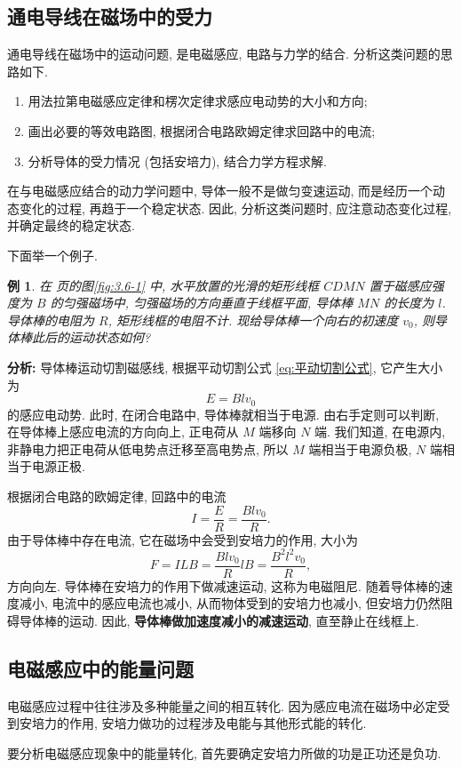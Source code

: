 \documentclass[UTF8,openany,fontset=fandol]{ctexbook}
\theoremstyle{chinesetextbook}
\newtheorem{example}{例}[chapter]
\begin{document}
\subsection{通电导线在磁场中的受力}
通电导线在磁场中的运动问题, 是电磁感应, 电路与力学的结合. 分析这类问题的思路如下.
\begin{enumerate}
\item 用法拉第电磁感应定律和楞次定律求感应电动势的大小和方向;
\item 画出必要的等效电路图, 根据闭合电路欧姆定律求回路中的电流;
\item 分析导体的受力情况 (包括安培力), 结合力学方程求解.
\end{enumerate}

在与电磁感应结合的动力学问题中, 导体一般不是做匀变速运动, 而是经历一个动态变化的过程, 再趋于一个稳定状态. 因此, 分析这类问题时, 应注意动态变化过程, 并确定最终的稳定状态.

下面举一个例子.
\begin{example}
在 \pageref{fig:3.6-1} 页的图\ref{fig:3.6-1} 中, 水平放置的光滑的矩形线框 $CDMN$ 置于磁感应强度为 $B$ 的匀强磁场中, 匀强磁场的方向垂直于线框平面, 导体棒 $MN$ 的长度为 $l$. 导体棒的电阻为 $R$, 矩形线框的电阻不计. 现给导体棒一个向右的初速度 $v_0$, 则导体棒此后的运动状态如何?
\end{example}
\par\indent\textbf{分析:} 导体棒运动切割磁感线, 根据平动切割公式 \eqref{eq:平动切割公式}, 它产生大小为
\[
E=Blv_0
\]
的感应电动势. 此时, 在闭合电路中, 导体棒就相当于电源. 由右手定则可以判断, 在导体棒上感应电流的方向向上, 正电荷从 $M$ 端移向 $N$ 端. 我们知道, 在电源内, 非静电力把正电荷从低电势点迁移至高电势点, 所以 $M$ 端相当于电源负极, $N$ 端相当于电源正极.

根据闭合电路的欧姆定律, 回路中的电流
\[
I=\frac{E}{R}=\frac{Blv_0}{R}.
\]
由于导体棒中存在电流, 它在磁场中会受到安培力的作用, 大小为
\[
F=ILB=\frac{Blv_0}{R}lB=\frac{B^2l^2v_0}{R},
\]
方向向左. 导体棒在安培力的作用下做减速运动, 这称为电磁阻尼. 随着导体棒的速度减小, 电流中的感应电流也减小, 从而物体受到的安培力也减小, 但安培力仍然阻碍导体棒的运动. 因此, \textbf{导体棒做加速度减小的减速运动}, 直至静止在线框上.
\subsection{电磁感应中的能量问题}
电磁感应过程中往往涉及多种能量之间的相互转化. 因为感应电流在磁场中必定受到安培力的作用, 安培力做功的过程涉及电能与其他形式能的转化.

要分析电磁感应现象中的能量转化, 首先要确定安培力所做的功是正功还是负功.
\end{document}
